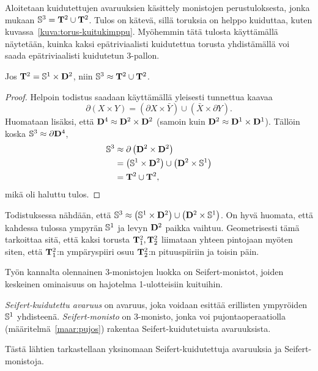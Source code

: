 Aloitetaan kuidutettujen avaruuksien käsittely monistojen perustuloksesta, jonka mukaan $\S^3=\TT^2\cup\TT^2$. Tulos on kätevä, sillä toruksia on helppo kuiduttaa, kuten kuvassa~\ref{kuva:torus-kuitukimppu}. Myöhemmin tätä tulosta käyttämällä  näytetään, kuinka kaksi epätriviaalisti kuidutettua torusta yhdistämällä voi saada epätriviaalisti kuidutetun 3-pallon.
\begin{lemma}
    Jos $\TT^2=\S^1\times \D^2$, niin $\S^3\approx\TT^2\cup\TT^2$.
    \label{lemma:s3-torushajotus}
\end{lemma}
\begin{proof}
    Helpoin todistus saadaan käyttämällä yleisesti tunnettua kaavaa
    \begin{equation*}
        \partial \left(X\times Y\right)=\left(\partial X\times\bar Y\right)\cup\left(\bar X\times\partial Y\right).
    \end{equation*}
    Huomataan lisäksi, että $\D^4\approx\D^2\times \D^2$ (samoin kuin $\D^2\approx\D^1\times \D^1$). Tällöin koska $\S^3\approx\partial\D^4$,
    \begin{align*}
        \S^3&\approx\partial\left(\D^2\times \D^2\right) \\
        &=\left(\S^1\times \D^2\right)\cup\left(\D^2\times\S^1\right) \\
        &=\TT^2\cup\TT^2,
    \end{align*}
    mikä oli haluttu tulos.
\end{proof}
\begin{huomautus}
    Todistuksessa nähdään, että $\S^3\approx\left(\S^1\times \D^2\right)\cup\left(\D^2\times\S^1\right)$. On hyvä huomata, että kahdessa tulossa ympyrän $\S^1$ ja levyn $\D^2$ paikka vaihtuu. Geometrisesti tämä tarkoittaa sitä, että kaksi torusta $\TT_1^2,\TT_2^2$ liimataan yhteen pintojaan myöten siten, että $\TT_1^2$:n ympäryspiiri osuu $\TT_2^2$:n pituuspiiriin ja toisin päin.
\end{huomautus}
Työn kannalta olennainen 3-monistojen luokka on Seifert-monistot, joiden keskeinen ominaisuus on hajotelma 1-ulotteisiin kuituihin.
\begin{maaritelma}
    \emph{Seifert-kuidutettu avaruus} on avaruus, joka voidaan esittää erillisten ympyröiden $\S^1$ yhdisteenä. \emph{Seifert-monisto} on 3-monisto, jonka voi pujontaoperaatiolla (määritelmä~\ref{maar:pujos}) rakentaa Seifert-kuidutetuista avaruuksista.
\end{maaritelma}
Tästä lähtien tarkastellaan yksinomaan Seifert-kuidutettuja avaruuksia ja Seifert-monistoja.
